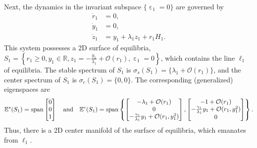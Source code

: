 \documentclass[10pt,onecolumn]{article}
\theoremstyle{plain}
\DeclareMathOperator{\eps}{\varepsilon}
\begin{document}
Next, the dynamics in the invariant subspace $\{ \eps_1 = 0 \}$ are governed by
%
\begin{equation}
  \begin{split}
      \dot r_1 &= 0, \\
      \dot y_1 &= 0, \\ 
      \dot z_1 &= y_1 + \lambda_1 z_1 + r_1 H_1.
  \end{split}
\end{equation}
%
This system possesses a 2D surface of equilibria, $S_1 = \left\{ r_1 \geq 0, y_1 \in \mathbb R, z_1 = -\tfrac{y_1}{\lambda_1} + \mathcal O(r_1), \eps_1 = 0 \right\}$, which contains the line $\ell_1$ of equilibria. The stable spectrum of $S_1$ is $\sigma_s(S_1) = \{ \lambda_1+\mathcal O(r_1) \}$, and the center spectrum of $S_1$ is $\sigma_c(S_1) = \{ 0,0 \}$. The corresponding (generalized) eigenspaces are
%
\[ \mathbb E^s(S_1) = {\rm span} \begin{bmatrix} 0 \\ 0 \\ 1 \end{bmatrix} \quad {\rm and } \quad \mathbb E^c(S_1) = {\rm span} \left\{ \begin{bmatrix} -\lambda_1+\mathcal O(r_1) \\ 0 \\ -\tfrac{\gamma_1}{\lambda_1} y_1 + \mathcal O(r_1, y_1^2) \end{bmatrix}, \begin{bmatrix} -1+\mathcal O(r_1) \\ -\tfrac{\gamma_1}{\lambda_1} y_1 + \mathcal O(r_1, y_1^2) \\ 0 \end{bmatrix} \right\}. \]
%
Thus, there is a 2D center manifold of the surface of equilibria, which emanates from $\ell_1$.
\end{document}
